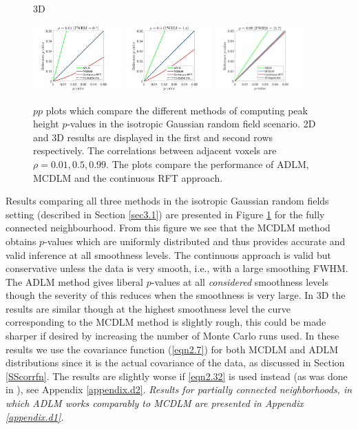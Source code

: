 \documentclass{article}
\newcommand{\nt}[1]{\textit{\color{red} #1}}
\begin{document}
\begin{figure}[!htp]
\begin{sideways}
\phantom{------------------}3D
\end{sideways}
\includegraphics[trim=80 5 80 5, clip,width=0.3\textwidth]{figure/3D_rho0.01_disc.jpg}
\includegraphics[trim=80 5 80 5, clip,width=0.3\textwidth]{figure/3D_rho0.5_disc.jpg}
\includegraphics[trim=100 5 100 5, clip,width=0.3\textwidth]{figure/3D_rho0.99_disc.jpg}
\caption{$pp$ plots which compare the different methods of computing peak height $p$-values in the isotropic Gaussian random field scenario. 2D and 3D results are displayed in the first and second rows respectively. The correlations between adjacent voxels are $\rho = 0.01, 0.5, 0.99$. The plots compare the performance of ADLM, MCDLM and the continuous RFT approach.\label{fig7}}
\end{figure}


Results comparing all three methods in the isotropic Gaussian random fields setting (described in Section \ref{sec3.1}) are presented in Figure \ref{fig7} for the fully connected neighbourhood. From this figure we see that the MCDLM method obtains $p$-values which are uniformly distributed and thus provides accurate and valid inference
at all smoothness levels. The continuous approach is valid but conservative unless the data is very smooth, i.e., with a large smoothing FWHM. The ADLM method gives liberal $p$-values at all \nt{considered} smoothness levels though the severity of this reduces when the smoothness is very large. In 3D the results are similar though at the highest smoothness level the curve corresponding to the MCDLM method is slightly rough, this could be made sharper if desired by increasing the number of Monte Carlo runs used. In these results we use the covariance function (\ref{eqn2.7}) for both MCDLM and ADLM distributions since it is the actual covariance of the data, as discussed in Section \ref{SScorrfn}. The results are slightly worse if \eqref{eqn2.32} is used instead (as was done in \cite{worsley2005improved, taylor2007maxima}), see Appendix \ref{appendix.d2}. \nt{Results for partially connected neighborhoods, in which ADLM works comparably to MCDLM are presented in Appendix \ref{appendix.d1}.}
\end{document}
